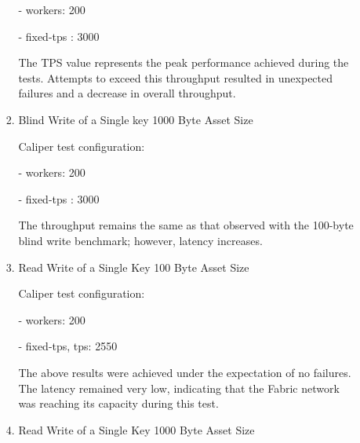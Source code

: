 \documentclass[conference]{IEEEtran}
\begin{document}
\begin{enumerate}[itemsep=2ex, parsep=1ex]
\begin{enumerate}[itemsep=2ex, parsep=1ex]
\begin{enumerate}[itemsep=2ex, parsep=1ex]
	      	      	      - workers: 200
	      	      	      	      	      	      	      	      	      
	      	      	      - fixed-tps : 3000
	      	      	      	      	      	      	      	      	      
	      	      	      The TPS value represents the peak performance achieved during the tests.
	      	      	      Attempts to exceed this throughput resulted in unexpected failures
	      	      	      and a decrease in overall throughput.
	      	      	      	      	      	      	      	      	      
	      	      	\item Blind Write of a Single key 1000 Byte Asset Size
	      	      	      	      	      	      	      	      	      
	      	      	      Caliper test configuration:
	      	      	      	      	      	      	      	      	      
	      	      	      - workers: 200
	      	      	      	      	      	      	      	      	      
	      	      	      - fixed-tps : 3000
	      	      	      	      	      	      	      	      	      
	      	      	      The throughput remains the same as that observed with the 100-byte
	      	      	      blind write benchmark; however, latency increases.
	      	      	      	      	      	      	      	      	      
	      	      	\item Read Write of a Single Key 100 Byte Asset Size
	      	      	      	      	      	      	      	      	      
	      	      	      Caliper test configuration:
	      	      	      	      	      	      	      	      	      
	      	      	      - workers: 200
	      	      	      	      	      	      	      	      	      
	      	      	      - fixed-tps, tps: 2550
	      	      	      	      	      	      	      	      	      
	      	      	      The above results were achieved under the expectation of no failures.
	      	      	      The latency remained very low, indicating that the Fabric network was
	      	      	      reaching its capacity during this test.
	      	      	      	      	      	      	      	      	      
	      	      	\item Read Write of a Single Key 1000 Byte Asset Size
	      	      	      	      	      	      	      	      	      

\end{enumerate}
\end{enumerate}
\end{enumerate}
\end{document}
